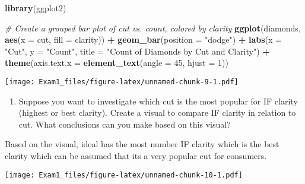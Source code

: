 \documentclass[
]{article}
\newenvironment{Shaded}{\begin{snugshade}}{\end{snugshade}}
\newcommand{\AttributeTok}[1]{\textcolor[rgb]{0.13,0.29,0.53}{#1}}
\newcommand{\CommentTok}[1]{\textcolor[rgb]{0.56,0.35,0.01}{\textit{#1}}}
\newcommand{\DecValTok}[1]{\textcolor[rgb]{0.00,0.00,0.81}{#1}}
\newcommand{\FunctionTok}[1]{\textcolor[rgb]{0.13,0.29,0.53}{\textbf{#1}}}
\newcommand{\NormalTok}[1]{#1}
\newcommand{\OtherTok}[1]{\textcolor[rgb]{0.56,0.35,0.01}{#1}}
\newcommand{\SpecialCharTok}[1]{\textcolor[rgb]{0.81,0.36,0.00}{\textbf{#1}}}
\newcommand{\StringTok}[1]{\textcolor[rgb]{0.31,0.60,0.02}{#1}}
\providecommand{\tightlist}{%
  \setlength{\itemsep}{0pt}\setlength{\parskip}{0pt}}
\begin{document}
\begin{Shaded}
\begin{Highlighting}[]
\FunctionTok{library}\NormalTok{(ggplot2)}

\CommentTok{\# Create a grouped bar plot of cut vs. count, colored by clarity}
\FunctionTok{ggplot}\NormalTok{(diamonds, }\FunctionTok{aes}\NormalTok{(}\AttributeTok{x =}\NormalTok{ cut, }\AttributeTok{fill =}\NormalTok{ clarity)) }\SpecialCharTok{+}
  \FunctionTok{geom\_bar}\NormalTok{(}\AttributeTok{position =} \StringTok{"dodge"}\NormalTok{) }\SpecialCharTok{+}
  \FunctionTok{labs}\NormalTok{(}\AttributeTok{x =} \StringTok{"Cut"}\NormalTok{, }\AttributeTok{y =} \StringTok{"Count"}\NormalTok{, }\AttributeTok{title =} \StringTok{"Count of Diamonds by Cut and Clarity"}\NormalTok{) }\SpecialCharTok{+}
  \FunctionTok{theme}\NormalTok{(}\AttributeTok{axis.text.x =} \FunctionTok{element\_text}\NormalTok{(}\AttributeTok{angle =} \DecValTok{45}\NormalTok{, }\AttributeTok{hjust =} \DecValTok{1}\NormalTok{))}
\end{Highlighting}
\end{Shaded}

\texttt{[image: Exam1\_files/figure-latex/unnamed-chunk-9-1.pdf]}

\begin{enumerate}
\def\labelenumi{\alph{enumi})}
\setcounter{enumi}{4}
\tightlist
\item
  Suppose you want to investigate which cut is the most popular for IF
  clarity (highest or best clarity). Create a visual to compare IF
  clarity in relation to cut. What conclusions can you make based on
  this visual?
\end{enumerate}

Based on the visual, ideal has the most number IF clarity which is the
best clarity which can be assumed that its a very popular cut for
consumers.

\begin{Shaded}
\end{Shaded}

\texttt{[image: Exam1\_files/figure-latex/unnamed-chunk-10-1.pdf]}
\end{document}
